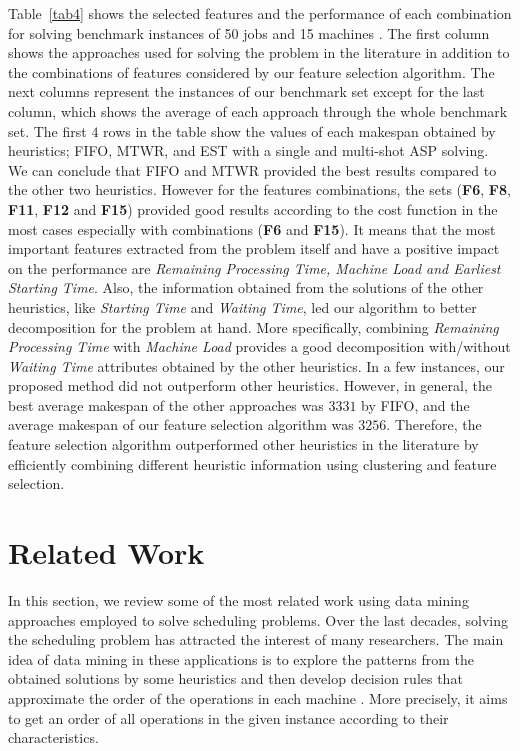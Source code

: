 \documentclass[runningheads]{llncs}
\begin{document}
Table~\ref{tab4} shows the selected features and the performance of each combination for solving benchmark instances of 50 jobs and 15 machines \cite{taillard1993benchmarks}. The first column shows the approaches used for solving the problem in the literature in addition to the combinations of features considered by our feature selection algorithm. The next columns represent the instances of our benchmark set except for the last column, which shows the average of each approach through the whole benchmark set. The first $4$ rows in the table show the values of each makespan obtained by heuristics; FIFO, MTWR, and EST with a single and multi-shot ASP solving. We can conclude that FIFO and MTWR provided the best results compared to the other two heuristics. However for the features combinations, the sets (\textbf{F6}, \textbf{F8}, \textbf{F11}, \textbf{F12} and \textbf{F15}) provided good results according to the cost function in the most cases especially with combinations (\textbf{F6} and \textbf{F15}). It means that the most important features extracted from the problem itself and have a positive impact on the performance are \textit{Remaining Processing Time, Machine Load and Earliest Starting Time}. Also, the information obtained from the solutions of the other heuristics, like \textit{Starting Time} and \textit{Waiting Time}, led our algorithm to better decomposition for the problem at hand. More specifically, combining \textit{Remaining Processing Time} with \textit{Machine Load} provides a good decomposition with/without \textit{Waiting Time} attributes obtained by the other heuristics. In a few instances, our proposed method did not outperform other heuristics. However, in general, the best average makespan of the other approaches was $3331$ by FIFO, and the average makespan of our feature selection algorithm was $3256$. Therefore, the feature selection algorithm outperformed other heuristics in the literature by efficiently combining different heuristic information using clustering and feature selection.

\section{Related Work}
\label{sec:literature}
In this section, we review some of the most related work using data mining approaches employed to solve scheduling problems. Over the last decades, solving the scheduling problem has attracted the interest of many researchers. The main idea of data mining in these applications is to explore the patterns from the obtained solutions by some heuristics and then develop decision rules that approximate the order of the operations in each machine \cite{ismail2012production}. More precisely, it aims to get an order of all operations in the given instance according to their characteristics.
\end{document}
